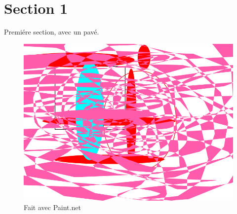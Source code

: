 \section {Section 1}
Premiére section, avec un pavé.

\begin{figure}[!ht]
\centering
\includegraphics[width=\textwidth]{images/test.png}
\caption{Fait avec Paint.net}
\end{figure}